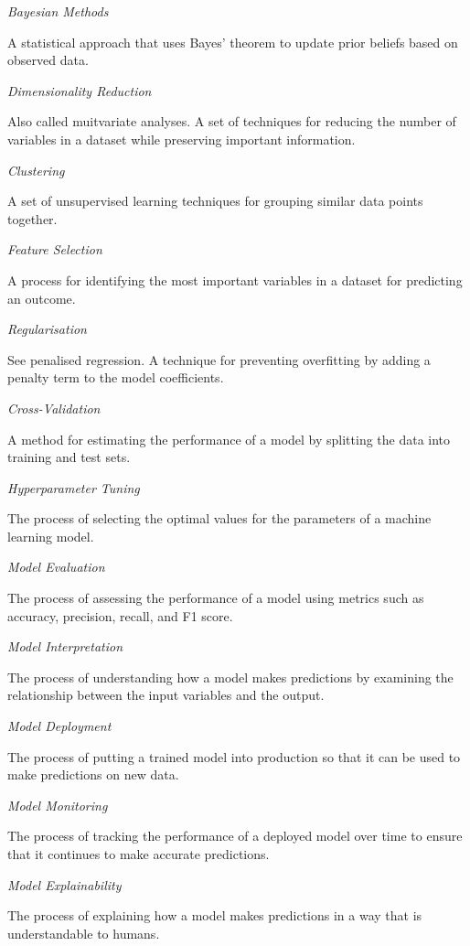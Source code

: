 \documentclass[
  letterpaper,
]{book}
\begin{document}
\emph{Bayesian Methods}

A statistical approach that uses Bayes' theorem to update prior beliefs
based on observed data.

\emph{Dimensionality Reduction}

Also called muitvariate analyses. A set of techniques for reducing the
number of variables in a dataset while preserving important information.

\emph{Clustering}

A set of unsupervised learning techniques for grouping similar data
points together.

\emph{Feature Selection}

A process for identifying the most important variables in a dataset for
predicting an outcome.

\emph{Regularisation}

See penalised regression. A technique for preventing overfitting by
adding a penalty term to the model coefficients.

\emph{Cross-Validation}

A method for estimating the performance of a model by splitting the data
into training and test sets.

\emph{Hyperparameter Tuning}

The process of selecting the optimal values for the parameters of a
machine learning model.

\emph{Model Evaluation}

The process of assessing the performance of a model using metrics such
as accuracy, precision, recall, and F1 score.

\emph{Model Interpretation}

The process of understanding how a model makes predictions by examining
the relationship between the input variables and the output.

\emph{Model Deployment}

The process of putting a trained model into production so that it can be
used to make predictions on new data.

\emph{Model Monitoring}

The process of tracking the performance of a deployed model over time to
ensure that it continues to make accurate predictions.

\emph{Model Explainability}

The process of explaining how a model makes predictions in a way that is
understandable to humans.
\end{document}
